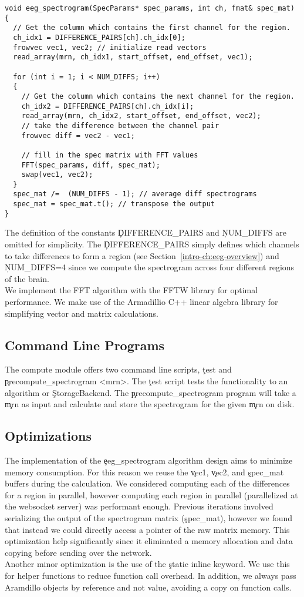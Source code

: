 \begin{lstlisting}
void eeg_spectrogram(SpecParams* spec_params, int ch, fmat& spec_mat)
{
  // Get the column which contains the first channel for the region.
  ch_idx1 = DIFFERENCE_PAIRS[ch].ch_idx[0];
  frowvec vec1, vec2; // initialize read vectors
  read_array(mrn, ch_idx1, start_offset, end_offset, vec1);

  for (int i = 1; i < NUM_DIFFS; i++)
  {
    // Get the column which contains the next channel for the region.
    ch_idx2 = DIFFERENCE_PAIRS[ch].ch_idx[i];
    read_array(mrn, ch_idx2, start_offset, end_offset, vec2);
    // take the difference between the channel pair
    frowvec diff = vec2 - vec1;

    // fill in the spec matrix with FFT values
    FFT(spec_params, diff, spec_mat);
    swap(vec1, vec2);
  }
  spec_mat /=  (NUM_DIFFS - 1); // average diff spectrograms
  spec_mat = spec_mat.t(); // transpose the output
}
\end{lstlisting}

The definition of the constants \c{DIFFERENCE\_PAIRS} and \c{NUM\_DIFFS} are
omitted for simplicity. The \c{DIFFERENCE\_PAIRS} simply defines which channels
to take differences to form a region (see Section~\ref{intro-ch:eeg-overview})
and \c{NUM\_DIFFS=4} since we compute the spectrogram across four different
regions of the brain. \\

We implement the FFT algorithm with the FFTW library \cite{fftw} for optimal
performance. We make use of the Armadillio C++ linear algebra library
\cite{arma} for simplifying vector and matrix calculations.

\subsection{Command Line Programs}\label{compute-ch:implementation-cmd}

The compute module offers two command line scripts, \c{test} and
\c{precompute\_spectrogram <mrn>}. The \c{test} script tests the functionality
to an algorithm or \c{StorageBackend}. The \c{precompute\_spectrogram} program
will take a \c{mrn} as input and calculate and store the spectrogram for the
given \c{mrn} on disk.

\subsection{Optimizations}

The implementation of the \c{eeg\_spectrogram} algorithm design aims to
minimize memory consumption. For this reason we reuse the \c{vec1}, \c{vec2},
and \c{spec\_mat} buffers during the calculation. We considered computing each
of the differences for a region in parallel, however computing each region in
parallel (parallelized at the websocket server) was performant enough. Previous
iterations involved serializing the output of the spectrogram matrix
(\c{spec\_mat}), however we found that instead we could directly access a
pointer of the raw matrix memory. This optimization help significantly since it
eliminated a memory allocation and data copying before sending over the
network. \\

Another minor optimization is the use of the \c{static inline} keyword. We use
this for helper functions to reduce function call overhead. In addition, we
always pass Aramdillo objects by reference and not value, avoiding a copy on
function calls.

